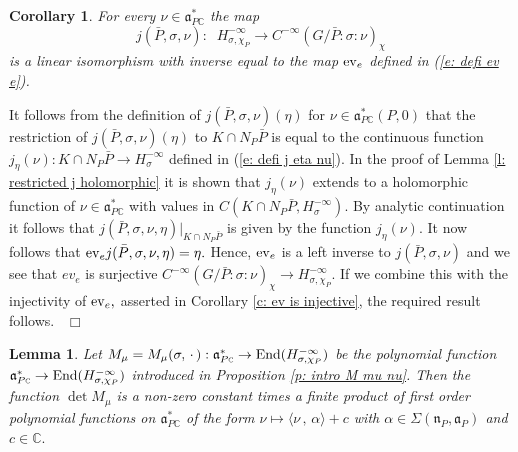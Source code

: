 \documentclass[12pt,a4paper]{article}
\newtheorem{Cor}[Thm]{Corollary}
\newtheorem{Lemma}[Thm]{Lemma}
\newenvironment{cor}[0]{\begin{Cor}\noindent}%
{\end{Cor}}
\newenvironment{lemma}[0]{\begin{Lemma}\noindent}%
{\end{Lemma}}
\def\proof{\par\noindent{\it Proof.}{\ }{\ }}
\def\qed{~\hfill\hbox{$\Box$}\medbreak}
\def\msy#1{{\mathbb #1}}
\def\C{{\msy C}}
\def\ga{\alpha}
\def\gs{\sigma}
\def\gS{\Sigma}
\def\got#1{\mathfrak #1}
\def\fa{{\got a}}
\def\fn{{\got n}}
\def\to{\rightarrow}
\def\inp#1#2{\langle#1\,,\,#2\rangle}
\def\End{{\rm End}}
\def\iC{{\scriptscriptstyle \C}}
\numberwithin{Thm}{section}
\numberwithin{equation}{section}
\def\dotvar{\, \cdot\,}
\def\ev{{\rm ev}}
\def\faPdc{{\fa_{P\iC}^*}}
\numberwithin{equation}{section}
\def\faPdc{\fa_{P\iC}^*}
\def\cchi{\chi}
\begin{document}
\begin{cor} 
\label{c: j bar P bijection}
For every $\nu \in \faPdc$ the map
$$ 
j(\bar P,\gs,\nu): \;\; H_{\gs,\cchi_P}^{-\infty} \to C^{-\infty}(G/\bar P: \gs :\nu)_\cchi
$$ 
is a linear isomorphism with inverse equal to the map $\ev_e$ defined in (\ref{e: defi ev e}).
\end{cor}

\proof 
It follows from the definition of $j(\bar P , \gs, \nu)(\eta)$ for $\nu \in \faPdc(P,0)$ that
the restriction of $j(\bar P, \gs, \nu)(\eta)$ to $K\cap N_P\bar P$ is equal to the continuous 
function $j_\eta(\nu): K\cap N_P \bar P \to H^{-\infty}_\gs $ defined in (\ref{e: defi j eta nu}). In the proof
of Lemma \ref{l: restricted j holomorphic} it is shown that $j_\eta(\nu)$ extends to a holomorphic function
of $\nu \in \faPdc$ with values in $C(K\cap N_P \bar P, H_\gs^{-\infty}).$ By analytic continuation it
follows that $j(\bar P , \gs, \nu, \eta)|_{K\cap N_P \bar P}$ is given by the function
$j_\eta(\nu).$ It now follows that $\ev_e j (\bar P, \gs, \nu ,\eta) = \eta.$ 
Hence, $\ev_e$ is a left inverse to $j(\bar P, \gs, \nu)$ and we see that $ev_e$ is surjective
$C^{-\infty}(G/\bar P: \gs :\nu)_\cchi \to H_{\gs,\cchi_P}^{-\infty}.$ If we combine this with the 
injectivity of $\ev_e,$ asserted in Corollary \ref{c: ev is injective}, the required result follows.
\qed 

\begin{lemma}
\label{l: det M mu product}
Let $M_\mu = M_{\mu}(\gs, \dotvar): \faPdc \to \End(H_{\gs,\cchi_P}^{-\infty})$ be the polynomial function
$\faPdc \to \End (H_{\gs,\cchi_P}^{-\infty})$ introduced in Proposition \ref{p: intro M mu nu}. 
Then the function $\det M_\mu$ is a non-zero constant times a finite product of first order polynomial 
functions on $\faPdc$  of the form $\nu \mapsto \inp{\nu}{\ga}  + c$ with $\ga \in \gS(\fn_P, \fa_P)$ 
and $c \in \C.$
\end{lemma}
\end{document}
